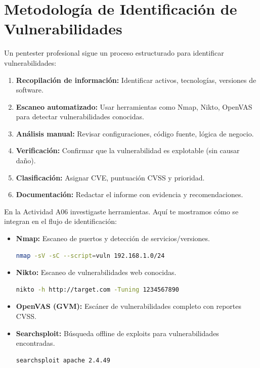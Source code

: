 \documentclass[11pt,a4paper]{article}
\begin{document}
\section{Metodología de Identificación de Vulnerabilidades}
Un pentester profesional sigue un proceso estructurado para identificar vulnerabilidades:

\begin{enumerate}[leftmargin=*]
  \item \textbf{Recopilación de información:} Identificar activos, tecnologías, versiones de software.
  \item \textbf{Escaneo automatizado:} Usar herramientas como Nmap, Nikto, OpenVAS para detectar vulnerabilidades conocidas.
  \item \textbf{Análisis manual:} Revisar configuraciones, código fuente, lógica de negocio.
  \item \textbf{Verificación:} Confirmar que la vulnerabilidad es explotable (sin causar daño).
  \item \textbf{Clasificación:} Asignar CVE, puntuación CVSS y prioridad.
  \item \textbf{Documentación:} Redactar el informe con evidencia y recomendaciones.
\end{enumerate}

\begin{herramienta}
En la Actividad A06 investigaste herramientas. Aquí te mostramos cómo se integran en el flujo de identificación:

\begin{itemize}[leftmargin=*]
  \item \textbf{Nmap:} Escaneo de puertos y detección de servicios/versiones.
  \begin{lstlisting}[language=bash]
nmap -sV -sC --script=vuln 192.168.1.0/24
  \end{lstlisting}
  \item \textbf{Nikto:} Escaneo de vulnerabilidades web conocidas.
  \begin{lstlisting}[language=bash]
nikto -h http://target.com -Tuning 1234567890
  \end{lstlisting}
  \item \textbf{OpenVAS (GVM):} Escáner de vulnerabilidades completo con reportes CVSS.
  \item \textbf{Searchsploit:} Búsqueda offline de exploits para vulnerabilidades encontradas.
  \begin{lstlisting}[language=bash]
searchsploit apache 2.4.49
  \end{lstlisting}
\end{itemize}
\end{herramienta}
\end{document}

